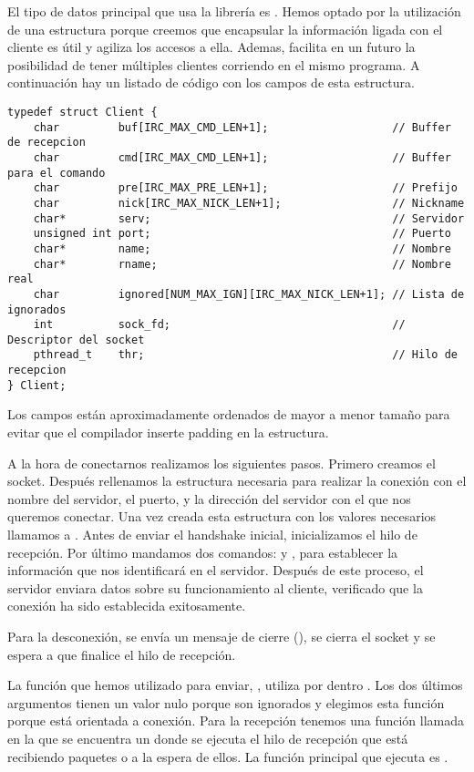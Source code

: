 \documentclass[12pt, a4paper]{memoriaeps}
\begin{document}
El tipo de datos principal que usa la librería es . Hemos optado por la utilización de una estructura porque creemos que encapsular la información ligada con el cliente es útil y agiliza los accesos a ella. Ademas, facilita en un futuro la posibilidad de tener múltiples clientes corriendo en el mismo programa. A continuación hay un listado de código con los campos de esta estructura.
\begin{lstlisting}[basicstyle=\scriptsize]
typedef struct Client {
	char         buf[IRC_MAX_CMD_LEN+1];                   // Buffer de recepcion
	char         cmd[IRC_MAX_CMD_LEN+1];                   // Buffer para el comando
	char         pre[IRC_MAX_PRE_LEN+1];                   // Prefijo
	char         nick[IRC_MAX_NICK_LEN+1];                 // Nickname
	char*        serv;                                     // Servidor
	unsigned int port;                                     // Puerto
	char*        name;                                     // Nombre
	char*        rname;                                    // Nombre real
	char         ignored[NUM_MAX_IGN][IRC_MAX_NICK_LEN+1]; // Lista de ignorados
	int          sock_fd;                                  // Descriptor del socket
	pthread_t    thr;                                      // Hilo de recepcion
} Client;
\end{lstlisting}
Los campos están aproximadamente ordenados de mayor a menor tamaño para evitar que el compilador inserte padding en la estructura.

A la hora de conectarnos realizamos los siguientes pasos. Primero creamos el socket. Después rellenamos la estructura necesaria para realizar la conexión con el nombre del servidor, el puerto, y la dirección del servidor con el que nos queremos conectar. Una vez creada esta estructura con los valores necesarios llamamos a . Antes de enviar el handshake inicial, inicializamos el hilo de recepción. Por último mandamos dos comandos:  y , para establecer la información que nos identificará en el servidor. Después de este proceso, el servidor enviara datos sobre su funcionamiento al cliente, verificado que la conexión ha sido establecida exitosamente.

Para la desconexión, se envía un mensaje de cierre (), se cierra el socket y se espera a que finalice el hilo de recepción.

La función que hemos utilizado para enviar, , utiliza por dentro . Los dos últimos argumentos tienen un valor nulo porque son ignorados y elegimos esta función porque está orientada a conexión. Para la recepción tenemos una función llamada  en la que se encuentra un  donde se ejecuta el hilo de recepción que está recibiendo paquetes o a la espera de ellos. La función principal que ejecuta es .
\end{document}
